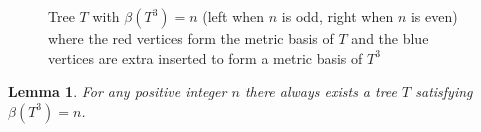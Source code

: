 \documentclass{article}
\newtheorem{lem}[thm]{Lemma}
\theoremstyle{definition}
\numberwithin{equation}{section}
\begin{document}
\begin{figure}
\begin{center}
\caption{Tree $T$ with $\beta{(T^{3})}=n$ (left when $n$ is odd, right when $n$ is even) where the red vertices form the metric basis of $T$ and the blue vertices are extra inserted to form a metric basis of $T^{3}$ } \label{fig3}
\end{center}

\end{figure}



\begin{lem}
For any positive integer $n$ there always exists a tree $T$ satisfying $\beta{(T^{3})}=n$.  
\end{lem}
\end{document}
